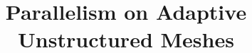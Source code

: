 
%




\title{Parallelism on Adaptive Unstructured Meshes}

\begin{frame}
  \titlepage
\end{frame}













